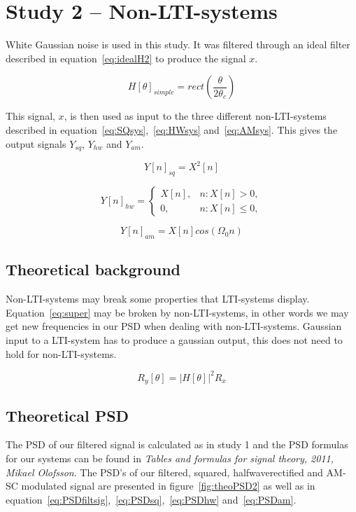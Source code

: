 \documentclass[10pt]{article}
\begin{document}
\clearpage


\section{Study 2 – Non-LTI-systems}
White Gaussian noise is used in this study. It was filtered through an ideal filter
described in equation~\ref{eq:idealH2} to produce the signal $x$.

\begin{equation}
  \label{eq:idealH2}
  H[\theta]_{simple} =rect(\frac{\theta} {2\theta_c})
\end{equation}

This signal, $x$, is then used as input to the three different non-LTI-systems
described in equation~\ref{eq:SQsys},~\ref{eq:HWsys} and~\ref{eq:AMsys}.
This gives the output signals $Y_{sq}$, $Y_{hw}$ and $Y_{am}$.

\begin{equation}
  \label{eq:SQsys}
  Y[n]_{sq} =X^2[n]
\end{equation}

\begin{equation}
  \label{eq:HWsys}
  Y[n]_{hw} =
\begin{cases}
   X[n],& n: X[n]>0,\\
    0,    & n: X[n] \leq 0,
\end{cases}
\end{equation}


\begin{equation}
  \label{eq:AMsys}
  Y[n]_{am} =X[n]cos(\Omega_{0}n)
\end{equation}

\subsection{Theoretical background}

Non-LTI-systems may break some properties that LTI-systems display.
Equation~\ref{eq:super} may be broken by non-LTI-systems, in other words we may
get new frequencies in our PSD when dealing with non-LTI-systems.
Gaussian input to a LTI-system has to produce a gaussian output, this does not
need to hold for non-LTI-systems.

\begin{equation}
  \label{eq:super}
  R_y[\theta] =|H[\theta]|^2R_x
\end{equation}


\subsection{Theoretical PSD}
The PSD of our filtered signal is calculated as in study 1 and the PSD formulas
for our systems can be found in  \emph{Tables and formulas for signal theory,
2011, Mikael Olofsson}. The PSD's of our filtered, squared, halfwaverectified
and AM-SC modulated signal
are presented in figure~\ref{fig:theoPSD2} as well as in equation~\ref{eq:PSDfiltsig},~\ref{eq:PSDsq},~\ref{eq:PSDhw}
and~\ref{eq:PSDam}.
\end{document}
